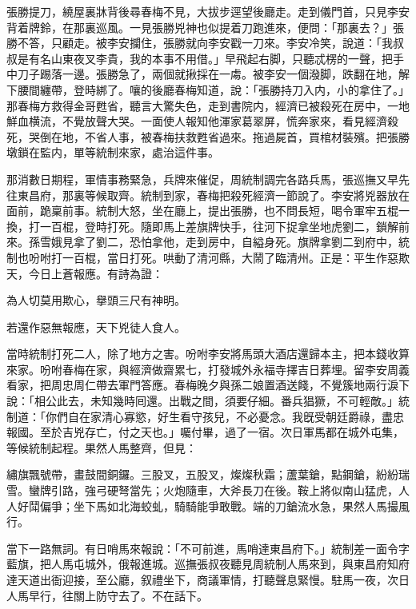 張勝提刀，繞屋裏牀背後尋春梅不見，大拔步逕望後廳走。走到儀門首，只見李安背着牌鈴，在那裏巡風。一見張勝兇神也似提着刀跑進來，便問：「那裏去？」張勝不答，只顧走。被李安攔住，張勝就向李安戳一刀來。李安冷笑，說道：「我叔叔是有名山東夜叉李貴，我的本事不用借。」早飛起右脚，只聽忒楞的一聲，把手中刀子踢落一邊。張勝急了，兩個就揪採在一䖏。被李安一個潑脚，跌翻在地，解下腰間纏帶，登時綁了。嚷的後廳春梅知道，說：「張勝持刀入内，小的拿住了。」那春梅方救得金哥甦省，聽言大驚失色，走到書院内，經濟已被殺死在房中，一地鮮血横流，不覺放聲大哭。一面使人報知他渾家葛翠屏，慌奔家來，看見經濟殺死，哭倒在地，不省人事，被春梅扶救甦省過來。拖過屍首，買棺材裝殯。把張勝墩鎖在監内，單等統制來家，處治這件事。

那消數日期程，軍情事務緊急，兵牌來催促，周統制調完各路兵馬，張巡撫又早先往東昌府，那裏等候取齊。統制到家，春梅把殺死經濟一節說了。李安將兇器放在面前，跪稟前事。統制大怒，坐在廳上，提出張勝，也不問長短，喝令軍牢五棍一換，打一百棍，登時打死。隨即馬上差旗牌快手，往河下捉拿坐地虎劉二，鎖解前來。孫雪娥見拿了劉二，恐怕拿他，走到房中，自縊身死。旗牌拿劉二到府中，統制也吩咐打一百棍，當日打死。哄動了清河縣，大鬧了臨清州。正是：平生作惡欺天，今日上蒼報應。有詩為證：

\begin{myquote}
為人切莫用欺心，擧頭三尺有神明。

若還作惡無報應，天下兇徒人食人。
\end{myquote}

當時統制打死二人，除了地方之害。吩咐李安將馬頭大酒店還歸本主，把本錢收算來家。吩咐春梅在家，與經濟做齋累七，打發城外永福寺擇吉日葬埋。留李安周義看家，把周忠周仁帶去軍門答應。春梅晚夕與孫二娘置酒送餞，不覺簇地兩行淚下說：「相公此去，未知幾時囘還。出戰之間，須要仔細。番兵猖獗，不可輕敵。」統制道：「你們自在家清心寡慾，好生看守孩兒，不必憂念。我旣受朝廷爵祿，盡忠報國。至於吉兇存亡，付之天也。」囑付畢，過了一宿。次日軍馬都在城外屯集，等候統制起程。果然人馬整齊，但見：

\begin{myquote}
繡旗飄號帶，畫鼓間銅鑼。三股叉，五股叉，燦燦秋霜；蘆葉鎗，點鋼鎗，紛紛瑞雪。蠻牌引路，強弓硬弩當先；火炮隨車，大斧長刀在後。鞍上將似南山猛虎，人人好鬦偏爭；坐下馬如北海蛟虬，騎騎能爭敢戰。端的刀鎗流水急，果然人馬撮風行。
\end{myquote}

當下一路無詞。有日哨馬來報說：「不可前進，馬哨達東昌府下。」統制差一面令字藍旗，把人馬屯城外，俄報進城。巡撫張叔夜聽見周統制人馬來到，與東昌府知府達天道出衙迎接，至公廳，叙禮坐下，商議軍情，打聽聲息緊慢。駐馬一夜，次日人馬早行，往關上防守去了。不在話下。


